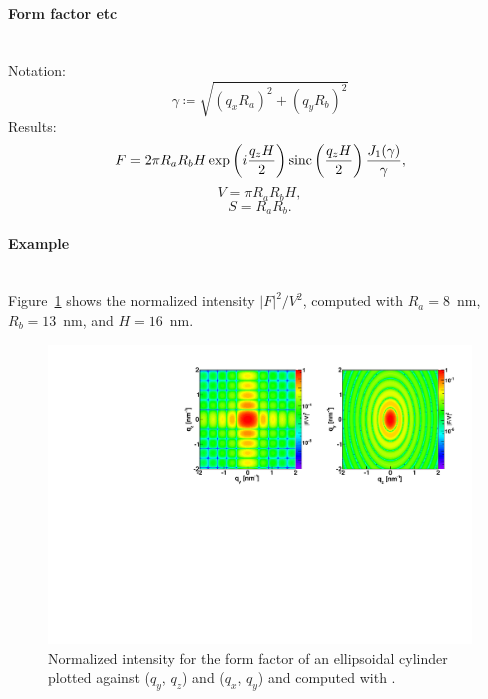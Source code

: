 \paragraph{Form factor etc}\strut\\
Notation:
\begin{equation*}
  \gamma \coloneqq \sqrt{(q_x R_a)^2+(q_y R_b)^2}  
\end{equation*}
Results:
\begin{equation*}
F = 2\pi R_a R_b H \exp\left(i\frac{q_z H}{2}\right)
   \operatorname{sinc}\left(\frac{q_z H}{2}\right) \frac{J_1(\gamma)}{\gamma},
\end{equation*}
\begin{equation*}
  V = \pi R_a R_bH,
\end{equation*}
\begin{equation*}
  S = R_a R_b.
\end{equation*}

\paragraph{Example}\strut\\
Figure~\ref{fig:FFellipscylinderEx} shows the normalized intensity
$|F|^2/V^2$, computed with $R_a=8$~nm, $R_b=13$~nm, and $H=16$~nm.
\begin{figure}[H]
\begin{center}
\includegraphics[angle=-90,width=\textwidth]{fig/ff/figffellipscylinder.pdf}
\end{center}
\caption{Normalized intensity for the form factor of an ellipsoidal
  cylinder plotted against ($q_y$, $q_z$) and ($q_x$,
  $q_y$) and computed with .}
\label{fig:FFellipscylinderEx}
\end{figure}

